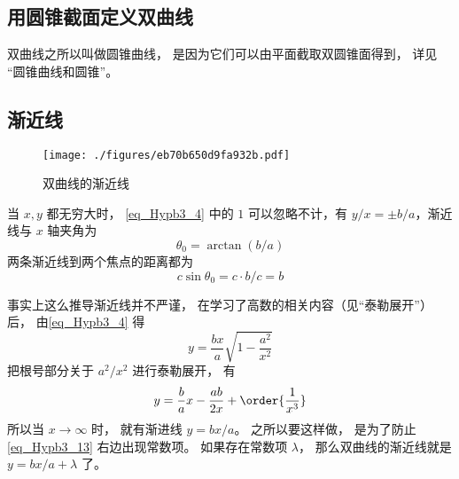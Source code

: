\subsection{用圆锥截面定义双曲线}
双曲线之所以叫做圆锥曲线， 是因为它们可以由平面截取双圆锥面得到， 详见 “圆锥曲线和圆锥”。

\subsection{渐近线}
\begin{figure}[ht]
\centering
\texttt{[image: ./figures/eb70b650d9fa932b.pdf]}
\caption{双曲线的渐近线} \label{fig_Hypb3_1}
\end{figure}

当 $x,y$ 都无穷大时， \autoref{eq_Hypb3_4} 中的 $1$ 可以忽略不计，有 $y/x = \pm b/a$，渐近线与 $x$ 轴夹角为
\begin{equation}\label{eq_Hypb3_1}
\theta_0 = \arctan(b/a)
\end{equation}
两条渐近线到两个焦点的距离都为
\begin{equation}\label{eq_Hypb3_11}
c\sin\theta_0 = c\cdot b/c = b
\end{equation}

事实上这么推导渐近线并不严谨， 在学习了高数的相关内容（见“泰勒展开”）后， 由\autoref{eq_Hypb3_4} 得
\begin{equation}
y = \frac{bx}{a} \sqrt{1-\frac{a^2}{x^2}}
\end{equation}
把根号部分关于 $a^2/x^2$ 进行泰勒展开， 有
\begin{equation}\label{eq_Hypb3_13}
y = \frac ba x - \frac{ab}{2x} + \order{\frac{1}{x^3}}
\end{equation}
所以当 $x\to\infty$ 时， 就有渐进线 $y = bx/a$。 之所以要这样做， 是为了防止\autoref{eq_Hypb3_13} 右边出现常数项。 如果存在常数项 $\lambda$， 那么双曲线的渐近线就是 $y = bx/a + \lambda$ 了。











